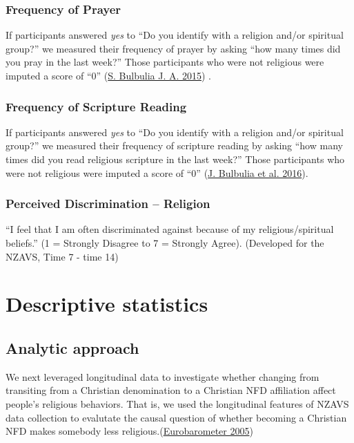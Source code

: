 \documentclass[
  singlecolumn]{report}
\begin{document}
\hypertarget{frequency-of-prayer}{%
\subsubsection{Frequency of Prayer}\label{frequency-of-prayer}}

If participants answered \emph{yes} to ``Do you identify with a religion
and/or spiritual group?'' we measured their frequency of prayer by
asking ``how many times did you pray in the last week?'' Those
participants who were not religious were imputed a score of ``0''
(\protect\hyperlink{ref-Bulbulia_2015}{S. Bulbulia J. A. 2015}) .

\hypertarget{frequency-of-scripture-reading}{%
\subsubsection{Frequency of Scripture
Reading}\label{frequency-of-scripture-reading}}

If participants answered \emph{yes} to ``Do you identify with a religion
and/or spiritual group?'' we measured their frequency of scripture
reading by asking ``how many times did you read religious scripture in
the last week?'' Those participants who were not religious were imputed
a score of ``0'' (\protect\hyperlink{ref-bulbulia2016}{J. Bulbulia et
al. 2016}).

\hypertarget{perceived-discrimination-religion}{%
\subsubsection{Perceived Discrimination --
Religion}\label{perceived-discrimination-religion}}

``I feel that I am often discriminated against because of my
religious/spiritual beliefs.'' (1 = Strongly Disagree to 7 = Strongly
Agree). (Developed for the NZAVS, Time 7 - time 14)

\hypertarget{descriptive-statistics}{%
\section{Descriptive statistics}\label{descriptive-statistics}}

\hypertarget{analytic-approach}{%
\subsection{Analytic approach}\label{analytic-approach}}

We next leveraged longitudinal data to investigate whether changing from
transiting from a Christian denomination to a Christian NFD affiliation
affect people's religious behaviors. That is, we used the longitudinal
features of NZAVS data collection to evalutate the causal question of
whether becoming a Christian NFD makes somebody less
religious.(\protect\hyperlink{ref-eurobarometer2005b}{Eurobarometer
2005})
\end{document}
